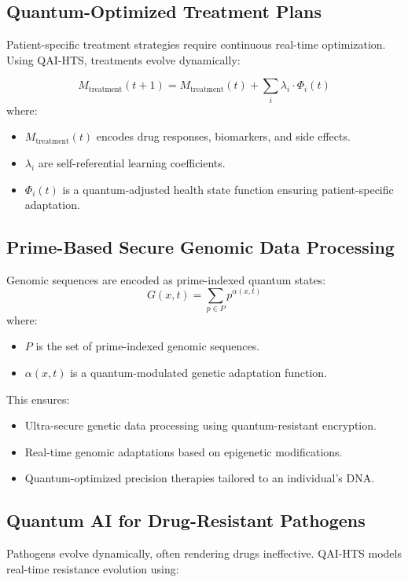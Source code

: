 \documentclass{article}
\theoremstyle{plain}
\begin{document}
\begin{itemize}
\begin{itemize}
\subsection{Quantum-Optimized Treatment Plans}
Patient-specific treatment strategies require continuous real-time optimization. Using QAI-HTS, treatments evolve dynamically:

\begin{equation}
    M_{\text{treatment}}(t+1) = M_{\text{treatment}}(t) + \sum_{i} \lambda_i \cdot \Phi_i(t)
\end{equation}
where:
\begin{itemize}
    \item \( M_{\text{treatment}}(t) \) encodes drug responses, biomarkers, and side effects.
    \item \( \lambda_i \) are self-referential learning coefficients.
    \item \( \Phi_i(t) \) is a quantum-adjusted health state function ensuring patient-specific adaptation.
\end{itemize}

\subsection{Prime-Based Secure Genomic Data Processing}
Genomic sequences are encoded as prime-indexed quantum states:
\begin{equation}
    G(x,t) = \sum_{p \in P} p^{\alpha(x,t)}
\end{equation}
where:
\begin{itemize}
    \item \( P \) is the set of prime-indexed genomic sequences.
    \item \( \alpha(x,t) \) is a quantum-modulated genetic adaptation function.
\end{itemize}

This ensures:
\begin{itemize}
    \item Ultra-secure genetic data processing using quantum-resistant encryption.
    \item Real-time genomic adaptations based on epigenetic modifications.
    \item Quantum-optimized precision therapies tailored to an individual's DNA.
\end{itemize}

\subsection{Quantum AI for Drug-Resistant Pathogens}
Pathogens evolve dynamically, often rendering drugs ineffective. QAI-HTS models real-time resistance evolution using:


\end{itemize}
\end{itemize}
\end{document}
